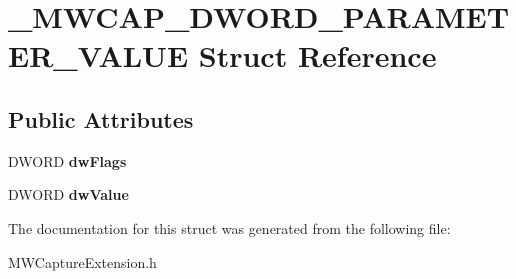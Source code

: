 \hypertarget{struct__MWCAP__DWORD__PARAMETER__VALUE}{\section{\-\_\-\-M\-W\-C\-A\-P\-\_\-\-D\-W\-O\-R\-D\-\_\-\-P\-A\-R\-A\-M\-E\-T\-E\-R\-\_\-\-V\-A\-L\-U\-E Struct Reference}
\label{struct__MWCAP__DWORD__PARAMETER__VALUE}
}
\subsection*{Public Attributes}
\begin{DoxyCompactItemize}
\item 
\hypertarget{struct__MWCAP__DWORD__PARAMETER__VALUE_a1be50a1689dbf211f2f331ce89ac91ec}{D\-W\-O\-R\-D {\bfseries dw\-Flags}}\label{struct__MWCAP__DWORD__PARAMETER__VALUE_a1be50a1689dbf211f2f331ce89ac91ec}

\item 
\hypertarget{struct__MWCAP__DWORD__PARAMETER__VALUE_a668bc07b8440346290ba60262ddbd76e}{D\-W\-O\-R\-D {\bfseries dw\-Value}}\label{struct__MWCAP__DWORD__PARAMETER__VALUE_a668bc07b8440346290ba60262ddbd76e}

\end{DoxyCompactItemize}


The documentation for this struct was generated from the following file\-:\begin{DoxyCompactItemize}
\item 
M\-W\-Capture\-Extension.\-h\end{DoxyCompactItemize}
